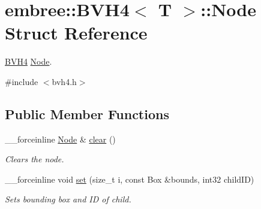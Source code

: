 \hypertarget{structembree_1_1_b_v_h4_1_1_node}{
\section{embree::BVH4$<$ T $>$::Node Struct Reference}
\label{structembree_1_1_b_v_h4_1_1_node}
}


\hyperlink{classembree_1_1_b_v_h4}{BVH4} \hyperlink{structembree_1_1_b_v_h4_1_1_node}{Node}.  




{\ttfamily \#include $<$bvh4.h$>$}

\subsection*{Public Member Functions}
\begin{DoxyCompactItemize}
\item 
\_\-\_\-forceinline \hyperlink{structembree_1_1_b_v_h4_1_1_node}{Node} \& \hyperlink{structembree_1_1_b_v_h4_1_1_node_a1d7e53422255cc5fcdc5d955f4db081b}{clear} ()
\begin{DoxyCompactList}\small\item\em Clears the node. \item\end{DoxyCompactList}\item 
\_\-\_\-forceinline void \hyperlink{structembree_1_1_b_v_h4_1_1_node_a5760613e1918cef5e399e4c502632317}{set} (size\_\-t i, const Box \&bounds, int32 childID)
\begin{DoxyCompactList}\small\item\em Sets bounding box and ID of child. \item\end{DoxyCompactList}\end{DoxyCompactItemize}
